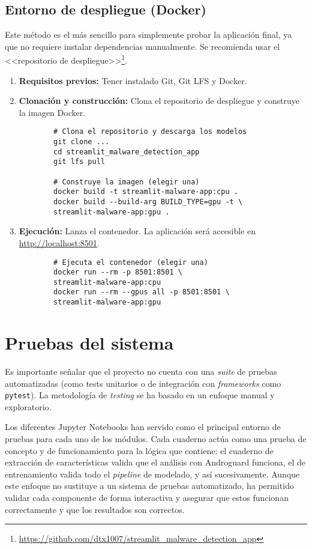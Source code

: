 \subsection{Entorno de despliegue (Docker)}
\label{despliegue_docker}
Este método es el más sencillo para simplemente probar la aplicación final, ya que no requiere instalar dependencias manualmente. Se recomienda usar el <<repositorio de despliegue>>\footnote{\url{https://github.com/dtx1007/streamlit_malware_detection_app}}.

\begin{enumerate}
	\item \textbf{Requisitos previos:} Tener instalado Git, Git LFS y Docker.
	
	\item \textbf{Clonación y construcción:} Clona el repositorio de despliegue y construye la imagen Docker.
	\begin{verbatim}
		# Clona el repositorio y descarga los modelos
		git clone ...
		cd streamlit_malware_detection_app
		git lfs pull
		
		# Construye la imagen (elegir una)
		docker build -t streamlit-malware-app:cpu .
		docker build --build-arg BUILD_TYPE=gpu -t \
		streamlit-malware-app:gpu .
	\end{verbatim}
	
	\item \textbf{Ejecución:} Lanza el contenedor. La aplicación será accesible en \url{http://localhost:8501}.
	\begin{verbatim}
		# Ejecuta el contenedor (elegir una)
		docker run --rm -p 8501:8501 \
		streamlit-malware-app:cpu
		docker run --rm --gpus all -p 8501:8501 \
		streamlit-malware-app:gpu
	\end{verbatim}
\end{enumerate}

\section{Pruebas del sistema}
Es importante señalar que el proyecto no cuenta con una \textit{suite} de pruebas automatizadas (como tests unitarios o de integración con \textit{frameworks} como \texttt{pytest}). La metodología de \textit{testing} se ha basado en un enfoque manual y exploratorio.

Los diferentes Jupyter Notebooks han servido como el principal entorno de pruebas para cada uno de los módulos. Cada cuaderno actúa como una prueba de concepto y de funcionamiento para la lógica que contiene: el cuaderno de extracción de características valida que el análisis con Androguard funciona, el de entrenamiento valida todo el \textit{pipeline} de modelado, y así sucesivamente. Aunque este enfoque no sustituye a un sistema de pruebas automatizado, ha permitido validar cada componente de forma interactiva y asegurar que estos funcionan correctamente y que los resultados son correctos.
